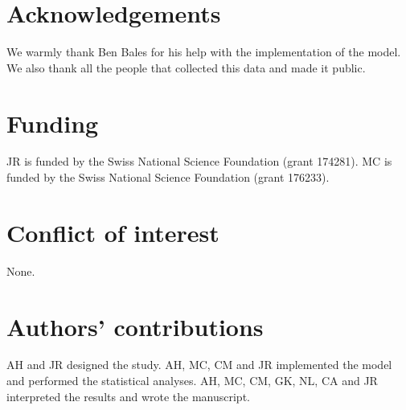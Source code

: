 \documentclass{article}
\begin{document}

  


\section*{Acknowledgements}

We warmly thank Ben Bales for his help with the implementation of the model. We also thank all the people that collected this data and made it public.

\section*{Funding}

JR is funded by the Swiss National Science Foundation (grant 174281). MC is funded by the Swiss National Science Foundation (grant 176233).

\section*{Conflict of interest}

None.

\section*{Authors' contributions}

AH and JR designed the study. 
AH, MC, CM and JR implemented the model and performed the statistical analyses. 
AH, MC, CM, GK, NL, CA and JR interpreted the results and wrote the manuscript.
\end{document}
